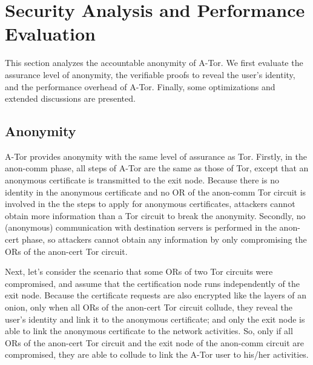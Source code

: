 \section{Security Analysis and Performance Evaluation}
\label{sec:analysis}
This section analyzes the accountable anonymity of A-Tor.
We first evaluate the assurance level of anonymity,
  the verifiable proofs to reveal the user's identity,
  and the performance overhead of A-Tor.
Finally,
  some optimizations and extended discussions are presented.


\subsection{Anonymity}

A-Tor provides anonymity with the same level of assurance as Tor.
Firstly, in the anon-comm phase,
  all steps of A-Tor are the same as those of Tor, except that an anonymous certificate is transmitted to the exit node.
Because there is no identity in the anonymous certificate
    and no OR of the anon-comm Tor circuit is involved in the the steps to apply for anonymous certificates,
  attackers cannot obtain more information than a Tor circuit to break the anonymity.
Secondly,
   no (anonymous) communication with destination servers is performed in the anon-cert phase,
   so attackers cannot obtain any information by only compromising the ORs of the anon-cert Tor circuit.


Next, let's consider the scenario that some ORs of two Tor circuits were compromised,
  and assume that the certification node runs independently of the exit node.
Because the certificate requests are also encrypted like the layers of an onion,
only when all ORs of the anon-cert Tor circuit collude,
  they reveal the user's identity and link it to the anonymous certificate;
and only the exit node is able to link the anonymous certificate to the network activities.
So, only if all ORs of the anon-cert Tor circuit and the exit node of the anon-comm circuit are compromised,
    they are able to collude to link the A-Tor user to his/her activities.

